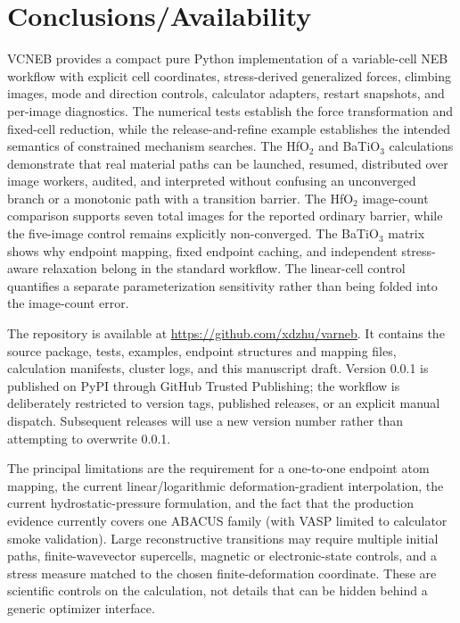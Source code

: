 \documentclass[final,3p,times]{elsarticle}
\begin{document}
\FloatBarrier
\section{Conclusions/Availability}
\label{sec:conclusions}

VCNEB provides a compact pure Python implementation of a variable-cell NEB
workflow with explicit cell coordinates, stress-derived generalized forces,
climbing images, mode and direction controls, calculator adapters, restart
snapshots, and per-image diagnostics.  The numerical tests establish the
force transformation and fixed-cell reduction, while the release-and-refine
example establishes the intended semantics of constrained mechanism searches.
The HfO$_2$ and BaTiO$_3$ calculations demonstrate that real material paths
can be launched, resumed, distributed over image workers, audited, and
interpreted without confusing an unconverged branch or a monotonic path with
a transition barrier.  The HfO$_2$ image-count comparison supports seven total
images for the reported ordinary barrier, while the five-image control remains
explicitly non-converged.  The BaTiO$_3$ matrix shows why endpoint mapping,
fixed endpoint caching, and independent stress-aware relaxation belong in the
standard workflow.  The linear-cell control quantifies a separate
parameterization sensitivity rather than being folded into the image-count
error.

The repository is available at
\url{https://github.com/xdzhu/varneb}.  It contains the source package, tests,
examples, endpoint structures and mapping files, calculation manifests,
cluster logs, and this manuscript draft.  Version 0.0.1 is published on PyPI
through GitHub Trusted Publishing; the workflow is deliberately restricted to
version tags, published releases, or an explicit manual dispatch.  Subsequent
releases will use a new version number rather than attempting to overwrite
0.0.1.

The principal limitations are the requirement for a one-to-one endpoint atom
mapping, the current linear/logarithmic deformation-gradient interpolation,
the current hydrostatic-pressure formulation, and the fact that the production
evidence currently covers one ABACUS family (with VASP limited to calculator
smoke validation).  Large reconstructive transitions may require multiple
initial paths, finite-wavevector supercells, magnetic or electronic-state
controls, and a stress measure matched to the chosen finite-deformation
coordinate.  These are scientific controls on the calculation, not details
that can be hidden behind a generic optimizer interface.


\end{document}
